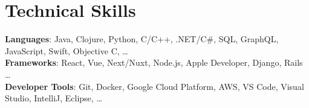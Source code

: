 \section{Technical Skills}\begin{itemize}[leftmargin=0.15in, label={}]
    \small{\item{
     \textbf{Languages}{: Java, Clojure, Python, C/C++, .NET/C\#, SQL, GraphQL, JavaScript, Swift, Objective C, …} \\
     \textbf{Frameworks}{: React, Vue, Next/Nuxt, Node.js, Apple Developer, Django, Rails …} \\
     \textbf{Developer Tools}{: Git, Docker, Google Cloud Platform, AWS, VS Code, Visual Studio, IntelliJ, Eclipse, …} \\
    }}
 \end{itemize}